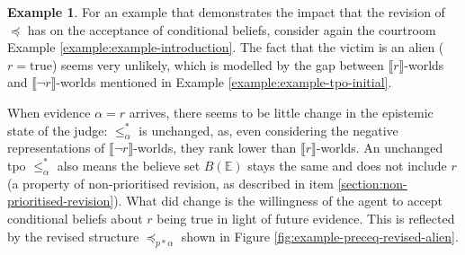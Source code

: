 \documentclass[english, 12pt]{scrartcl}
\theoremstyle{definition}
\newtheorem{example}{Example}
\theoremstyle{definition}
\theoremstyle{definition}
\newcommand{\modelsOf}[1]{\llbracket #1 \rrbracket}
\begin{document}
\begin{example}
    \label{example:example-preceq-revised-alien}
    For an example that demonstrates the impact that the revision of $\preceq$ has on the acceptance of conditional beliefs, consider again the courtroom Example \ref{example:example-introduction}. The fact that the victim is an alien ($r=\textrm{true}$) seems very unlikely, which is modelled by the gap between $\modelsOf{r}$-worlds and $\modelsOf{\neg r}$-worlds mentioned in Example \ref{example:example-tpo-initial}.
    
    When evidence $\alpha = r$ arrives, there seems to be little change in the epistemic state of the judge: $\leq_{\alpha}^{\ast}$ is unchanged, as, even considering the negative representations of $\modelsOf{\neg r}$-worlds, they rank lower than $\modelsOf{r}$-worlds. An unchanged tpo $\leq_{\alpha}^{\ast}$ also means the believe set $B(\mathbb{E})$ stays the same and does not include $r$ (a property of non-prioritised revision, as described in item \ref{section:non-prioritised-revision}). What did change is the willingness of the agent to accept conditional beliefs about $r$ being true in light of future evidence. This is reflected by the revised structure $\preceq_{p \ast \alpha}$ shown in Figure \ref{fig:example-preceq-revised-alien}.

    \begin{figure}[H]
            \centering
\end{figure}
\end{example}
\end{document}
